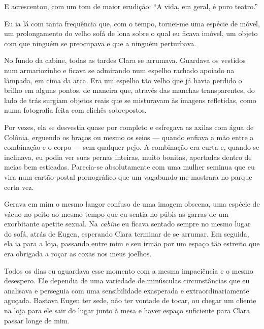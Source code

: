 E acrescentou, com um tom de maior erudição: ``A vida, em geral, é puro teatro.''


Eu ia lá com tanta frequência que, com o tempo, tornei-me uma espécie de móvel, um prolongamento do velho sofá de lona sobre o qual eu ficava imóvel, um objeto com que ninguém se preocupava e que a ninguém perturbava.

No fundo da cabine, todas as tardes Clara se arrumava. Guardava os vestidos num armariozinho e ficava se admirando num espelho rachado apoiado na lâmpada, em cima da arca. Era um espelho tão velho que já havia perdido o brilho em alguns pontos, de maneira que, através das manchas transparentes, do lado de trás surgiam objetos reais que se misturavam às imagens refletidas, como numa fotografia feita com clichês sobrepostos.

Por vezes, ela se desvestia quase por completo e esfregava as axilas com água de Colônia, erguendo os braços ou mesmo os seios --- quando enfiava a mão entre a combinação e o corpo --- sem qualquer pejo. A combinação era curta e, quando se inclinava, eu podia ver suas pernas inteiras, muito bonitas, apertadas dentro de meias bem esticadas. Parecia-se absolutamente com uma mulher seminua que eu vira num cartão-postal pornográfico que um vagabundo me mostrara no parque certa vez.

Gerava em mim o mesmo langor confuso de uma imagem obscena, uma espécie de vácuo no peito ao mesmo tempo que eu sentia no púbis as garras de um exorbitante apetite sexual.
Na \textit{cabine} eu ficava sentado sempre no mesmo lugar do sofá, atrás de Eugen, esperando Clara terminar de se arrumar. Em seguida, ela ia para a loja, passando entre mim e seu irmão por um espaço tão estreito que era obrigada a roçar as coxas nos meus joelhos.

Todos os dias eu aguardava esse momento com a mesma impaciência e o mesmo desespero. Ele dependia de uma variedade de minúsculas circunstâncias que eu analisava e perseguia com uma sensibilidade exasperada e extraordinariamente aguçada. Bastava Eugen ter sede, não ter vontade de tocar, ou chegar um cliente na loja para ele sair do lugar junto à mesa e haver espaço suficiente para Clara passar longe de mim.


